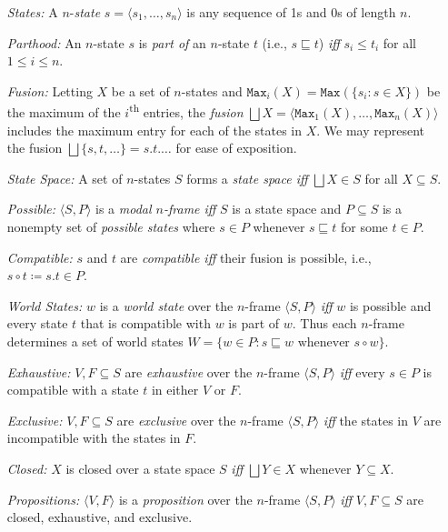 \documentclass[a4paper, 11pt]{article} %
\newcommand{\tuple}[1]{\langle#1\rangle} %
\newcommand{\set}[1]{\lbrace#1\rbrace} %
\renewcommand{\max}[0]{\texttt{Max}}
\begin{document}
\begin{enumerate}
  \item[\it States:] A $n$-\textit{state} $s=\tuple{s_1,\ldots,s_n}$ is any sequence of 1s and 0s of length $n$.
  \item[\it Parthood:] An $n$-state $s$ is \textit{part of} an $n$-state $t$ (i.e., $s\sqsubseteq t$) \textit{iff} $s_i\leq t_i$ for all $1\leq i\leq n$.
  \item[\it Fusion:] Letting $X$ be a set of $n$-states and $\max_i(X)=\max(\set{s_i:s\in X})$ be the maximum of the $i$\textsuperscript{th} entries, the \textit{fusion} $\bigsqcup X=\tuple{\max_1(X),\ldots,\max_n(X)}$ includes the maximum entry for each of the states in $X$.
    We may represent the fusion $\bigsqcup\set{s,t,\ldots}=s.t.\ldots$ for ease of exposition.
  \item[\it State Space:] A set of $n$-states $S$ forms a \textit{state space iff} $\bigsqcup X\in S$ for all $X\subseteq S$.
  \item[\it Possible:] $\tuple{S,P}$ is a \textit{modal $n$-frame iff} $S$ is a state space and $P\subseteq S$ is a nonempty set of \textit{possible states} where $s\in P$ whenever $s\sqsubseteq t$ for some $t\in P$.
  \item[\it Compatible:] $s$ and $t$ are \textit{compatible iff} their fusion is possible, i.e., $s\circ t\coloneq s.t\in P$.
  \item[\it World States:] $w$ is a \textit{world state} over the $n$-frame $\tuple{S,P}$ \textit{iff} $w$ is possible and every state $t$ that is compatible with $w$ is part of $w$. Thus each $n$-frame determines a set of world states $W=\set{w\in P: s\sqsubseteq w \text{ whenever } s\circ w}$.
  \item[\it Exhaustive:] $V,F\subseteq S$ are \textit{exhaustive} over the $n$-frame $\tuple{S,P}$ \textit{iff} every $s\in P$ is compatible with a state $t$ in either $V$ or $F$.
  \item[\it Exclusive:] $V,F\subseteq S$ are \textit{exclusive} over the $n$-frame $\tuple{S,P}$ \textit{iff} the states in $V$ are incompatible with the states in $F$.
  \item[\it Closed:] $X$ is closed over a state space $S$ \textit{iff} $\bigsqcup Y\in X$ whenever $Y\subseteq X$.
  \item[\it Propositions:] $\tuple{V,F}$ is a \textit{proposition} over the $n$-frame $\tuple{S,P}$ \textit{iff} $V,F\subseteq S$ are closed, exhaustive, and exclusive.

\end{enumerate}
\end{document}
